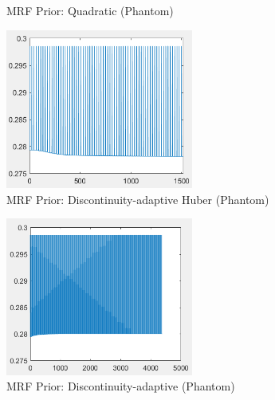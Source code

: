 \documentclass[12pt]{article}
\theoremstyle{definition}
\numberwithin{thm}{section}
\begin{document}
\begin{enumerate}[label=(\alph*)]
\begin{figure}[H]
    	\caption{MRF Prior: Quadratic (Phantom)}
    	\label{fig:Q1G}
	\end{figure}
	\begin{figure}[H]
		\centering
    	\includegraphics[width=0.55\textwidth]{imgs/DAH_Phantom_RRMSE.png}
    	\caption{MRF Prior: Discontinuity-adaptive Huber (Phantom)}
    	\label{fig:DAH1G}
	\end{figure}
	\begin{figure}[H]
		\centering
    	\includegraphics[width=0.55\textwidth]{imgs/DA_Phantom_RRMSE.png}
    	\caption{MRF Prior: Discontinuity-adaptive (Phantom)}
    	\label{fig:DA1G}
	\end{figure}
\end{enumerate}
\newpage
\end{document}
